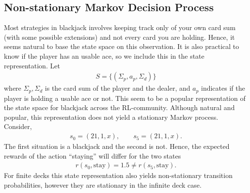 \subsection{Non-stationary Markov Decision Process} \label{sec:nonstationaryMDP}
Most strategies in blackjack involves keeping track only of your own card sum (with some possible extensions) and not every card you are holding. 
Hence, it seems natural to base the state space on this observation. It is also practical to know if the player has an usable ace, so we include this in the state representation. 
Let
\begin{align*}
	S = \{  (\Sigma_p, a_p, \Sigma_d )  \}
\end{align*}
where $\Sigma_p,\Sigma_d$ is the card sum of the player and the dealer, and $a_p$ indicates if the player is holding a usable ace or not. 
This seem to be a popular representation of the state space for blackjack across the RL-community. 
Although natural and popular, this representation does not yield a stationary Markov process. Consider,
\begin{align*}
	s_0 = (21, 1, x),\qquad s_5 = (21,1,x).
\end{align*}
The first situation is a blackjack and the second is not. Hence, the expected rewards of the action ``staying'' will differ for the two states
\begin{align*}
	r(s_0, \text{stay}) = 1.5 \neq r(s_5, \text{stay}). 
\end{align*}
For finite decks this state representation also yields non-stationary transition probabilities, however they are stationary in the infinite deck case.

